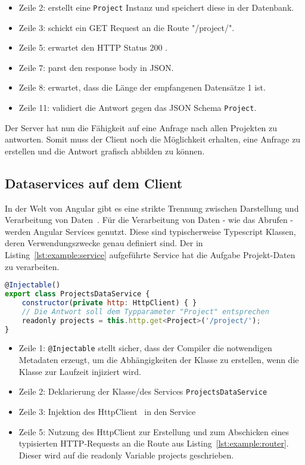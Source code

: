 \begin{itemize}
	\setlength\itemsep{-1em}
	\item Zeile 2: erstellt eine \texttt{Project} Instanz und speichert diese in der Datenbank.
	\item Zeile 3: schickt ein GET Request an die Route "/project/".
	\item Zeile 5: erwartet den HTTP Status 200 . 
	\item Zeile 7: parst den response body in JSON.
	\item Zeile 8: erwartet, dass die Länge der empfangenen Datensätze 1 ist.
	\item Zeile 11: validiert die Antwort gegen das JSON Schema \texttt{Project}.
\end{itemize}

Der Server hat nun die Fähigkeit auf eine Anfrage nach allen Projekten zu antworten.
Somit muss der Client noch die Möglichkeit erhalten, eine Anfrage zu erstellen und die Antwort grafisch abbilden zu können.

\subsection{Dataservices auf dem Client}
\label{sec:requirements:example:service}
In der Welt von Angular gibt es eine strikte Trennung zwischen Darstellung und Verarbeitung von Daten~\cite{angular-service}.
Für die Verarbeitung von Daten - wie das Abrufen - werden Angular Services genutzt. Diese sind typischerweise Typescript Klassen,
deren Verwendungszwecke genau definiert sind. Der in Listing~\ref{lst:example:service} aufgeführte Service hat die Aufgabe Projekt-Daten zu verarbeiten.

\begin{lstlisting}[language=JavaScript,float=h!,caption={Funktion zum Abruf aller Projekte vom Server}, label={lst:example:service}]
@Injectable()
export class ProjectsDataService {
    constructor(private http: HttpClient) { }
    // Die Antwort soll dem Typparameter "Project" entsprechen
    readonly projects = this.http.get<Project>('/project/');
}
\end{lstlisting}

\begin{itemize}
    \setlength\itemsep{-1em}
    \item Zeile 1: \texttt{@Injectable} stellt sicher, dass der Compiler die notwendigen Metadaten erzeugt, um die Abhängigkeiten der Klasse zu erstellen, wenn die Klasse zur Laufzeit injiziert wird.
    \item Zeile 2: Deklarierung der Klasse/des Services \texttt{ProjectsDataService}
    \item Zeile 3: Injektion des HttpClient~\cite{angular-http} in den Service
    \item Zeile 5: Nutzung des HttpClient zur Erstellung und zum Abschicken eines typisierten HTTP-Requests an die Route aus Listing~\ref{lst:example:router}.
    Dieser wird auf die readonly Variable projects geschrieben.
\end{itemize}

